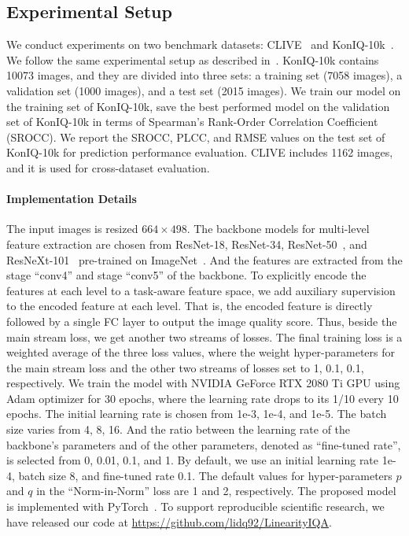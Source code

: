\documentclass[sigconf]{acmart}
\begin{document}
\subsection{Experimental Setup}
\label{sec:experiments}
We conduct experiments on two benchmark datasets: CLIVE~\cite{ghadiyaram2016massive} and KonIQ-10k~\cite{hosu2019koniq}.
We follow the same experimental setup as described in~\cite{hosu2019koniq}.
KonIQ-10k contains 10073 images, and they are divided into three sets: a training set (7058 images), a validation set (1000 images), and a test set (2015 images).
We train our model on the training set of KonIQ-10k, save the best performed model on the validation set of KonIQ-10k in terms of Spearman's Rank-Order Correlation Coefficient (SROCC).
We report the SROCC, PLCC, and RMSE values on the test set of KonIQ-10k for prediction performance evaluation.
CLIVE includes 1162 images, and it is used for cross-dataset evaluation.

\paragraph{Implementation Details}
The input images is resized $664\times 498$.
The backbone models for multi-level feature extraction are chosen from ResNet-18, ResNet-34, ResNet-50~\cite{he2016deep}, and ResNeXt-101~\cite{xie2017aggregated} pre-trained on ImageNet~\cite{deng2009imagenet}. 
And the features are extracted from the stage ``conv4'' and stage ``conv5'' of the backbone.
To explicitly encode the features at each level to a task-aware feature space, we add auxiliary supervision to the encoded feature at each level. 
That is, the encoded feature is directly followed by a single FC layer to output the image quality score. 
Thus, beside the main stream loss, we get another two streams of losses.
The final training loss is a weighted average of the three loss values, where the weight hyper-parameters for the main stream loss and the other two streams of losses set to 1, 0.1, 0.1, respectively. 
We train the model with NVIDIA GeForce RTX 2080 Ti GPU using Adam optimizer for 30 epochs, where the learning rate drops to its 1/10 every 10 epochs.
The initial learning rate is chosen from 1e-3, 1e-4, and 1e-5.
The batch size varies from 4, 8, 16. 
And the ratio between the learning rate of the backbone's parameters and of the other parameters, denoted as ``fine-tuned rate'', is selected from 0, 0.01, 0.1, and 1.
By default, we use an initial learning rate 1e-4, batch size 8, and fine-tuned rate 0.1.
The default values for hyper-parameters $p$ and $q$ in the ``Norm-in-Norm'' loss are 1 and 2, respectively.
The proposed model is implemented with PyTorch~\cite{paszke2019pytorch}.
To support reproducible scientific research, we have released our code at \url{https://github.com/lidq92/LinearityIQA}.
\end{document}
